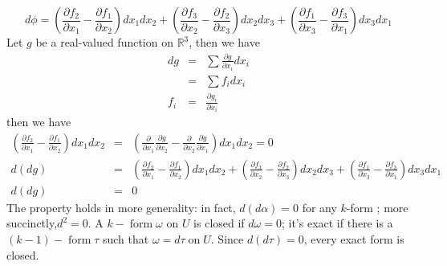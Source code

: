 \documentclass{article}
\newcommand{\tmop}[1]{\ensuremath{\operatorname{#1}}}
\begin{document}
{}
\[ d \phi = \left( \frac{\partial f_2}{\partial x_1} - \frac{\partial
   f_1}{\partial x_2} \right) d x_1 d x_2 + \left( \frac{\partial
   f_3}{\partial x_2} - \frac{\partial f_2}{\partial x_3} \right) d x_2 d x_3
   + \left( \frac{\partial f_1}{\partial x_3} - \frac{\partial f_3}{\partial
   x_1} \right) d x_3 d x_1 \]
Let $g$ be a real-valued function on $\mathbb{R}^3$, then we have
\begin{eqnarray*}
  d g & = & \sum \frac{\partial g}{\partial x_i} d x_i\\
  & = & \sum f_i d x_i\\
  f_i & = & \frac{\partial g_i}{\partial x_i}
\end{eqnarray*}
then we have
\begin{eqnarray}
  \left( \frac{\partial f_2}{\partial x_1} - \frac{\partial f_1}{\partial x_2}
  \right) d x_1 d x_2 & = & \left( \frac{\partial}{\partial x_1}
  \frac{\partial g}{\partial x_2} - \frac{\partial}{\partial x_2}
  \frac{\partial g}{\partial x_1} \right) d x_1 d x_2 = 0 \nonumber\\
  d (d g) & = & \left( \frac{\partial f_2}{\partial x_1} - \frac{\partial
  f_1}{\partial x_2} \right) d x_1 d x_2 + \left( \frac{\partial f_3}{\partial
  x_2} - \frac{\partial f_2}{\partial x_3} \right) d x_2 d x_3 + \left(
  \frac{\partial f_1}{\partial x_3} - \frac{\partial f_3}{\partial x_1}
  \right) d x_3 d x_1 \nonumber\\
  d (d g) & = & 0 
\end{eqnarray}
The property holds in more generality: in fact, $\mathit{d} (\mathit{d
\alpha}) = 0$ for any $\mathit{k}$-form {\alpha}; more
succinctly,$\mathit{d}^2 = 0$. A $k - \tmop{form} \omega$ on $U$ is closed if
$d \omega = 0$; it's exact if there is a $(k - 1) - \tmop{form} \tau$ such
that $\omega = d \tau \tmop{on} U$. Since $d (d \tau) = 0$, every exact form
is closed. \
\end{document}
